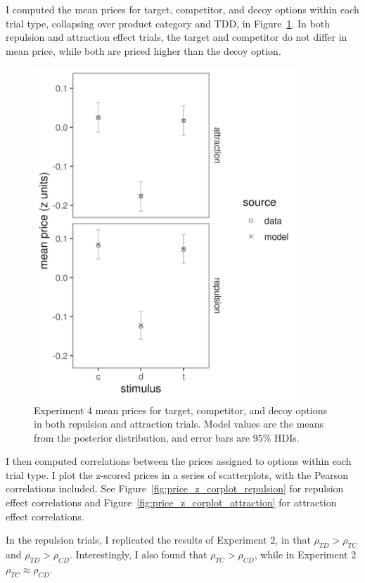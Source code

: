 I computed the mean prices for target, competitor, and decoy options within each trial type, collapsing over product category and TDD, in Figure~\ref{fig:price_mu_model_data}. In both repulsion and attraction effect trials, the target and competitor do not differ in mean price, while both are priced higher than the decoy option.

\begin{figure}
    \includegraphics[scale=0.5, width=100mm]{figures/pricing_mu_model_data.jpeg}
    \caption{Experiment 4 mean prices for target, competitor, and decoy options in both repulsion and attraction trials. Model values are the means from the posterior distribution, and error bars are $95\%$ HDIs.}
    \label{fig:price_mu_model_data}
\end{figure}

I then computed correlations between the prices assigned to options within each trial type. I plot the z-scored prices in a series of scatterplots, with the Pearson correlations included. See Figure~\ref{fig:price_z_corplot_repulsion} for repulsion effect correlations and Figure~\ref{fig:price_z_corplot_attraction} for attraction effect correlations. 

In the repulsion trials, I replicated the results of Experiment 2, in that $\rho_{TD}>\rho_{TC}$ and $\rho_{TD}>\rho_{CD}$. Interestingly, I also found that $\rho_{TC}>\rho_{CD}$, while in Experiment 2 $\rho_{TC}\approx\rho_{CD}$.

